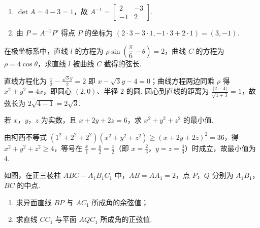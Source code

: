 \begin{solution}
\begin{enumerate}
\item \(\det A=4-3=1\)，故 \(A^{-1}=\begin{bmatrix}2&-3\\-1&2\end{bmatrix}\).
\item 由 \(P=A^{-1}P'\) 得点 \(P\) 的坐标为 \((2\cdot3-3\cdot1,-1\cdot3+2\cdot1)=(3,-1)\).
\end{enumerate}
\end{solution}

\reuseproblemnumber
\begin{problem}[C]
在极坐标系中，直线 \(l\) 的方程为 \(\rho\sin\!\left(\dfrac{\pi}{6}-\theta\right)=2\)，曲线 \(C\) 的方程为 \(\rho=4\cos\theta\)，求直线 \(l\) 被曲线 \(C\) 截得的弦长.
\end{problem}

\begin{solution}
直线方程化为 \(\frac{x}{2}-\frac{\sqrt3y}{2}=2\) 即 \(x-\sqrt3y-4=0\)；曲线方程两边同乘 \(\rho\) 得 \(x^2+y^2=4x\)，即圆心 \((2,0)\)、半径 \(2\) 的圆. 圆心到直线的距离为 \(\frac{|2-4|}{\sqrt{1+3}}=1\)，故弦长为 \(2\sqrt{4-1}=2\sqrt3\).
\end{solution}

\reuseproblemnumber
\begin{problem}[D]
若 \(x\)，\(y\)，\(z\) 为实数，且 \(x+2y+2z=6\)，求 \(x^2+y^2+z^2\) 的最小值.
\end{problem}

\begin{solution}
由柯西不等式 \((1^2+2^2+2^2)(x^2+y^2+z^2)\geqslant(x+2y+2z)^2=36\)，得 \(x^2+y^2+z^2\geqslant4\)，等号在 \(\frac{x}{1}=\frac{y}{2}=\frac{z}{2}\)（即 \(x=\frac23\)，\(y=z=\frac43\)）时成立，故最小值为 \(4\).
\end{solution}



\begin{problem}
如图，在正三棱柱 \(ABC-A_1B_1C_1\) 中，\(AB=AA_1=2\)，点 \(P\)，\(Q\) 分别为 \(A_1B_1\)，\(BC\) 的中点.

\begin{enumerate}
\item 求异面直线 \(BP\) 与 \(AC_1\) 所成角的余弦值；
\item 求直线 \(CC_1\) 与平面 \(AQC_1\) 所成角的正弦值.
\end{enumerate}

\begin{center}
\end{center}
\end{problem}

